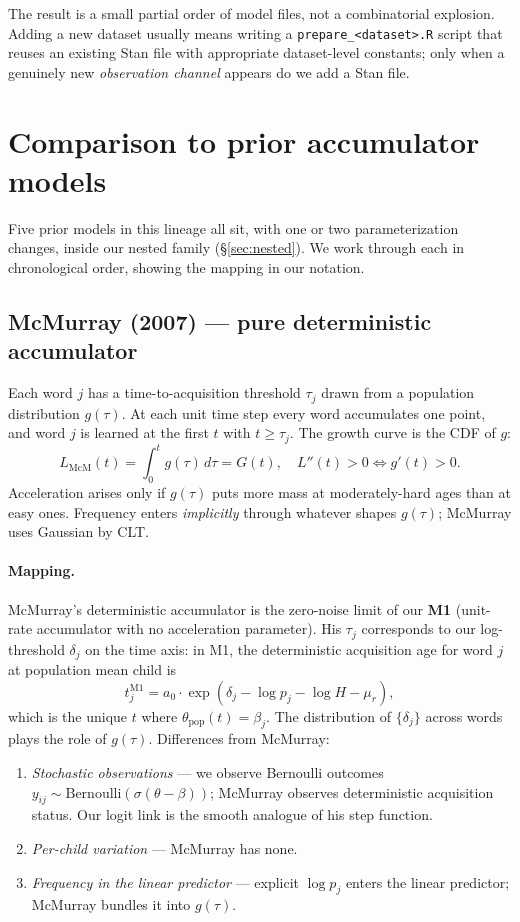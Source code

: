 \documentclass[11pt]{article}
\newcommand{\Bern}{\mathrm{Bernoulli}}
\begin{document}
The result is a small partial order of model files, not a
combinatorial explosion. Adding a new dataset usually means writing
a \texttt{prepare\_<dataset>.R} script that reuses an existing Stan
file with appropriate dataset-level constants; only when a genuinely
new \emph{observation channel} appears do we add a Stan file.

\section{Comparison to prior accumulator models}
\label{sec:compare}

Five prior models in this lineage all sit, with one or two
parameterization changes, inside our nested family
(§\ref{sec:nested}). We work through each in chronological order,
showing the mapping in our notation.

\subsection*{McMurray (2007) — pure deterministic accumulator}

Each word \(j\) has a time-to-acquisition threshold \(\tau_j\) drawn
from a population distribution \(g(\tau)\). At each unit time step
every word accumulates one point, and word \(j\) is learned at the
first \(t\) with \(t \ge \tau_j\). The growth curve is the CDF of
\(g\):
\[
L_{\mathrm{McM}}(t) = \int_0^t g(\tau)\,d\tau = G(t),
\quad
L''(t) > 0 \iff g'(t) > 0.
\]
Acceleration arises only if \(g(\tau)\) puts more mass at
moderately-hard ages than at easy ones. Frequency enters
\emph{implicitly} through whatever shapes \(g(\tau)\); McMurray uses
Gaussian by CLT.

\paragraph{Mapping.} McMurray's deterministic accumulator is the
zero-noise limit of our \textbf{M1} (unit-rate accumulator with no
acceleration parameter). His \(\tau_j\) corresponds to our
log-threshold \(\delta_j\) on the time axis: in M1, the deterministic
acquisition age for word \(j\) at population mean child is
\[
t_j^{\mathrm{M1}} = a_0 \cdot \exp(\delta_j - \log p_j - \log H - \mu_r),
\]
which is the unique \(t\) where \(\theta_{\mathrm{pop}}(t) = \beta_j\).
The distribution of \(\{\delta_j\}\) across words plays the role of
\(g(\tau)\). Differences from McMurray:
\begin{enumerate}[leftmargin=1.3em]
\item \emph{Stochastic observations} — we observe Bernoulli outcomes
\(y_{ij} \sim \Bern(\sigma(\theta - \beta))\); McMurray observes
deterministic acquisition status. Our logit link is the smooth
analogue of his step function.
\item \emph{Per-child variation} — McMurray has none.
\item \emph{Frequency in the linear predictor} — explicit \(\log p_j\)
enters the linear predictor; McMurray bundles it into \(g(\tau)\).
\end{enumerate}
\end{document}
